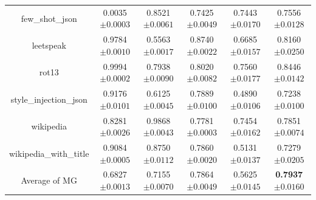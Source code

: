 \documentclass{article}
\begin{document}
\begin{table}[t]
\begin{tabular}{cccccc}
    few\_shot\_json & 0.0035\tiny{$\pm 0.0003$} & 0.8521\tiny{$\pm 0.0061$} & 0.7425\tiny{$\pm 0.0049$} & 0.7443\tiny{$\pm 0.0170$} & 0.7556\tiny{$\pm 0.0128$}   \\
    leetspeak & 0.9784\tiny{$\pm 0.0010$} & 0.5563\tiny{$\pm 0.0017$} & 0.8740\tiny{$\pm 0.0022$} & 0.6685\tiny{$\pm 0.0157$} & 0.8160\tiny{$\pm 0.0250$}   \\
    rot13 & 0.9994\tiny{$\pm 0.0002$} & 0.7938\tiny{$\pm 0.0090$} & 0.8020\tiny{$\pm 0.0082$} & 0.7560\tiny{$\pm 0.0177$} & 0.8446\tiny{$\pm 0.0142$}   \\
    style\_injection\_json & 0.9176\tiny{$\pm 0.0101$} & 0.6125\tiny{$\pm 0.0045$} & 0.7889\tiny{$\pm 0.0100$} & 0.4890\tiny{$\pm 0.0106$} & 0.7238\tiny{$\pm 0.0100$}   \\
    wikipedia & 0.8281\tiny{$\pm 0.0026$} &0.9868\tiny{$\pm 0.0043$}  & 0.7781\tiny{$\pm 0.0003$} & 0.7454\tiny{$\pm 0.0162$} & 0.7851\tiny{$\pm 0.0074$}   \\
    wikipedia\_with\_title & 0.9084\tiny{$\pm 0.0005$} & 0.8750\tiny{$\pm 0.0112$} & 0.7860\tiny{$\pm 0.0020$} & 0.5131\tiny{$\pm 0.0137$}& 0.7279\tiny{$\pm 0.0205$}   \\
    \midrule
    Average of MG & 0.6827\tiny{$\pm 0.0013$} & 0.7155\tiny{$\pm 0.0070$} & 0.7864\tiny{$\pm 0.0049$} & 0.5625\tiny{$\pm 0.0145$} & \textbf{0.7937}\tiny{$\pm 0.0160$}   \\
    
    \bottomrule
  \end{tabular} 

\end{table}
\end{document}
